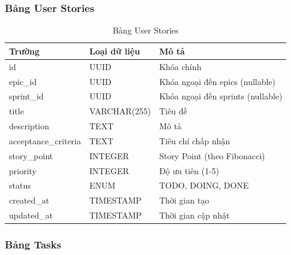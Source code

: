\documentclass[12pt,a4paper]{report}
\begin{document}
\subsubsection{Bảng User Stories}

\begin{table}[H]
\centering
\caption{Bảng User Stories}
\begin{tabular}{|p{4cm}|p{3.5cm}|p{6cm}|}
\hline
\textbf{Trường} & \textbf{Loại dữ liệu} & \textbf{Mô tả} \\
\hline
id & UUID & Khóa chính \\
\hline
epic\_id & UUID & Khóa ngoại đến epics (nullable) \\
\hline
sprint\_id & UUID & Khóa ngoại đến sprints (nullable) \\
\hline
title & VARCHAR(255) & Tiêu đề \\
\hline
description & TEXT & Mô tả \\
\hline
acceptance\_criteria & TEXT & Tiêu chí chấp nhận \\
\hline
story\_point & INTEGER & Story Point (theo Fibonacci) \\
\hline
priority & INTEGER & Độ ưu tiên (1-5) \\
\hline
status & ENUM & TODO, DOING, DONE \\
\hline
created\_at & TIMESTAMP & Thời gian tạo \\
\hline
updated\_at & TIMESTAMP & Thời gian cập nhật \\
\hline
\end{tabular}
\label{tab:user_stories_table}
\end{table}

\subsubsection{Bảng Tasks}
\end{document}
